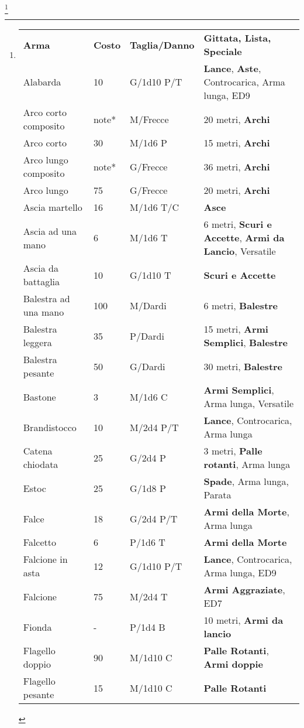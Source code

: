 \documentclass[landscape,10pt,a4paper]{article}
\begin{document}
\begin{multicols}{2}
	\footnote{
	\begin{tabularx}{0.95\textwidth}{llll}
	\textbf{Arma}&\textbf{Costo}&\textbf{Taglia/Danno} & \textbf{Gittata, Lista, Speciale}\\
	Alabarda& 10 & G/1d10 P/T& \textbf{Lance}, \textbf{Aste}, Controcarica, Arma lunga, ED9 \\
	Arco corto composito& note*& M/Frecce& 20 metri, \textbf{Archi}\\
	Arco corto& 30 & M/1d6 P& 15 metri, \textbf{Archi}\\
	Arco lungo composito& note*& G/Frecce& 36 metri, \textbf{Archi}\\
	Arco lungo& 75 & G/Frecce& 20 metri, \textbf{Archi}\\
	Ascia martello& 16 & M/1d6 T/C& \textbf{Asce}\\
	Ascia ad una mano& 6 & M/1d6 T& 6 metri, \textbf{Scuri e Accette}, \textbf{Armi da Lancio}, Versatile\\
	Ascia da battaglia& 10 & G/1d10 T&\textbf{Scuri e Accette}\\
	Balestra ad una mano& 100& M/Dardi& 6 metri, \textbf{Balestre}\\
	Balestra leggera& 35 & P/Dardi& 15 metri, \textbf{Armi Semplici}, \textbf{Balestre}\\
	Balestra pesante& 50 & G/Dardi& 30 metri, \textbf{Balestre}\\
	Bastone& 3& M/1d6 C& \textbf{Armi Semplici}, Arma lunga, Versatile\\
	Brandistocco& 10 & M/2d4 P/T& \textbf{Lance}, Controcarica, Arma lunga\\
	Catena chiodata& 25 & G/2d4 P& 3 metri, \textbf{Palle rotanti}, Arma lunga\\
	Estoc& 25& G/1d8 P& \textbf{Spade}, Arma lunga, Parata\\
	Falce& 18 & G/2d4 P/T& \textbf{Armi della Morte}, Arma lunga\\
	Falcetto& 6& P/1d6 T& \textbf{Armi della Morte}\\
	Falcione in asta& 12 & G/1d10 P/T& \textbf{Lance}, Controcarica, Arma lunga, ED9\\
	Falcione& 75 & M/2d4 T& \textbf{Armi Aggraziate}, ED7\\
	Fionda& -& P/1d4 B& 10 metri, \textbf{Armi da lancio}\\
	Flagello doppio& 90 & M/1d10 C& \textbf{Palle Rotanti}, \textbf{Armi doppie}\\
	Flagello pesante& 15 & M/1d10 C& \textbf{Palle Rotanti}\\

\end{tabularx}}
\end{multicols}
\end{document}
